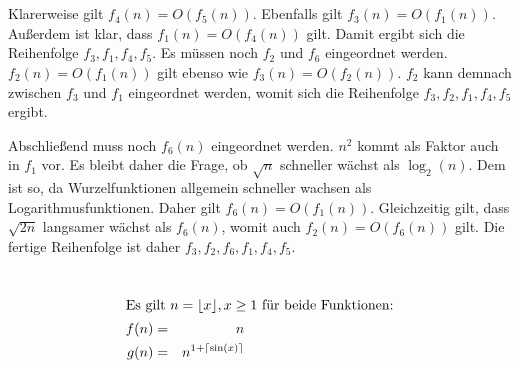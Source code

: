 \documentclass[10pt,a4paper,oneside,ngerman,numbers=noenddot]{scrartcl}
\begin{document}
\section{} %
\subsection{} %
Klarerweise gilt $f_{4}(n) = O(f_{5}(n))$. Ebenfalls gilt $f_{3}(n) = O(f_{1}(n))$. Außerdem ist klar, dass $f_{1}(n) = O(f_{4}(n))$ gilt.
Damit ergibt sich die Reihenfolge $f_{3}, f_{1}, f_{4}, f_{5}$.
Es müssen noch $f_{2}$ und $f_{6}$ eingeordnet werden. $f_{2}(n) = O(f_{1}(n))$ gilt ebenso wie $f_{3}(n) = O(f_{2}(n))$. $f_{2}$ kann demnach zwischen $f_{3}$ und $f_{1}$ eingeordnet werden, womit sich die Reihenfolge $f_{3}, f_{2}, f_{1}, f_{4}, f_{5}$ ergibt.

Abschließend muss noch $f_{6}(n)$ eingeordnet werden. $n^{2}$ kommt als Faktor auch in $f_{1}$ vor. Es bleibt daher die Frage, ob $\sqrt{n}$ schneller wächst als $\log_{2}(n)$. Dem ist so, da Wurzelfunktionen allgemein schneller wachsen als Logarithmusfunktionen. Daher gilt $f_{6}(n) = O(f_{1}(n))$. Gleichzeitig gilt, dass $\sqrt{2n}$ langsamer wächst als $f_{6}(n)$, womit auch $f_{2}(n) = O(f_{6}(n))$ gilt. Die fertige Reihenfolge ist daher $f_{3}, f_{2}, f_{6}, f_{1}, f_{4}, f_{5}$.
\subsection{} %
\section{} %
\subsection{} %
\subsection{} %
\begin{alignat*}{2}
\intertext{Es gilt $n = \lfloor x \rfloor, x \geq 1$ für beide Funktionen:}
f(n) &=& n \\
g(n) &=& n^{1+ \lceil \sin (x) \rceil}
\end{alignat*}
\end{document}
